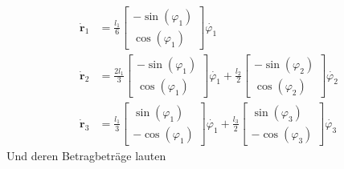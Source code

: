 \begin{align*}
	\dot{\textbf{r}}_1 &= \frac{l_1}{6}\begin{bmatrix}
		-\sin(\varphi_1) \\
		\cos(\varphi_1)
	\end{bmatrix} \dot{\varphi_1} \\
	\dot{\textbf{r}}_2 &= \frac{2l_1}{3}\begin{bmatrix}
	-\sin(\varphi_1) \\
	\cos(\varphi_1)
	\end{bmatrix} \dot{\varphi_1}
	+ \frac{l_2}{2}\begin{bmatrix}
		-\sin(\varphi_2) \\
		\cos(\varphi_2)
	\end{bmatrix}\dot{\varphi_2} \\
	\dot{\textbf{r}}_3 &= \frac{l_1}{3}\begin{bmatrix}
		\sin(\varphi_1) \\
		-\cos(\varphi_1)
	\end{bmatrix}\dot{\varphi_1}
	+ \frac{l_3}{2}\begin{bmatrix}
		\sin(\varphi_3) \\
		-\cos(\varphi_3)
	\end{bmatrix}\dot{\varphi_3}
\end{align*}
Und deren Betragbeträge lauten
